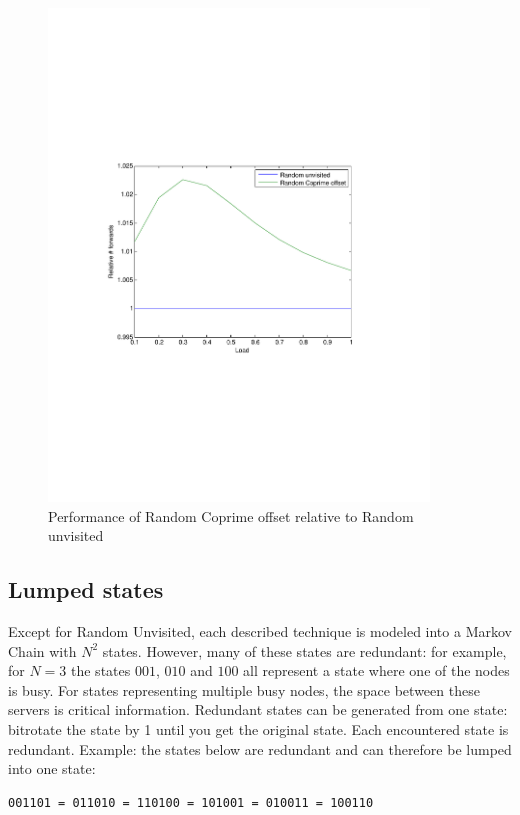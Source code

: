 \documentclass[10pt,a4paper]{article}
\begin{document}
\begin{figure}[h!tb]
\centering
\includegraphics[clip=true, trim=9em 24em 9em 24em, width=0.9\textwidth]{resources/plotrandunvisitedrandprime.pdf}
\caption{Performance of Random Coprime offset relative to Random unvisited}
\label{figrurcpo}
\end{figure}

\subsection{Lumped states}
\label{lump}

Except for Random Unvisited, each described technique is modeled into a Markov Chain with $N^2$ states. However, many of these states are redundant: for example, for $N=3$ the states $001$, $010$ and $100$ all represent a state where one of the nodes is busy. For states representing multiple busy nodes, the space between these servers is critical information. Redundant states can be generated from one state: bitrotate the state by 1 until you get the original state. Each encountered state is redundant.
Example: the states below are redundant and can therefore be lumped into one state:
\begin{verbatim}
001101 = 011010 = 110100 = 101001 = 010011 = 100110
\end{verbatim}
\end{document}
